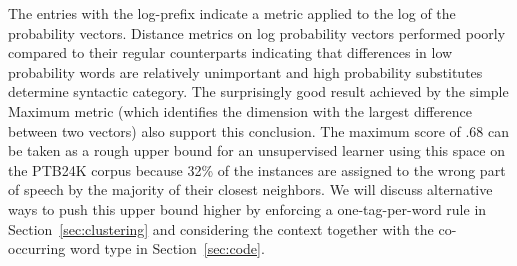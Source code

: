 The entries with the log-prefix indicate a metric applied to the log
of the probability vectors.  Distance metrics on log probability
vectors performed poorly compared to their regular counterparts
indicating that differences in low probability words are relatively
unimportant and high probability substitutes determine syntactic
category.  The surprisingly good result achieved by the simple Maximum
metric (which identifies the dimension with the largest difference
between two vectors) also support this conclusion.  The maximum score
of .68 can be taken as a rough upper bound for an unsupervised learner
using this space on the PTB24K corpus because 32\% of the instances
are assigned to the wrong part of speech by the majority of their
closest neighbors.  We will discuss alternative ways to push this
upper bound higher by enforcing a one-tag-per-word rule in
Section~\ref{sec:clustering} and considering the context together with
the co-occurring word type in Section~\ref{sec:code}.


